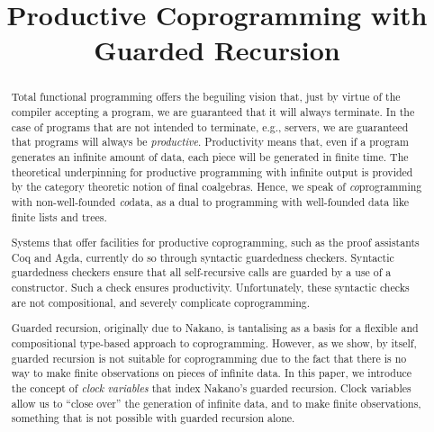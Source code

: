 \documentclass[natbib]{sigplanconf}
\title{Productive Coprogramming with Guarded Recursion}
\begin{document}
\exclusivelicense
{}

\maketitle

\begin{abstract}
  Total functional programming offers the beguiling vision that, just
  by virtue of the compiler accepting a program, we are guaranteed
  that it will always terminate. In the case of programs that are not
  intended to terminate, e.g., servers, we are guaranteed that
  programs will always be \emph{productive}. Productivity means that,
  even if a program generates an infinite amount of data, each piece
  will be generated in finite time. The theoretical underpinning for
  productive programming with infinite output is provided by the
  category theoretic notion of final coalgebras. Hence, we speak of
  \emph{co}programming with non-well-founded \emph{co}data, as a dual
  to programming with well-founded data like finite lists and trees.

  Systems that offer facilities for productive coprogramming, such as
  the proof assistants Coq and Agda, currently do so through syntactic
  guardedness checkers. Syntactic guardedness checkers ensure that all
  self-recursive calls are guarded by a use of a constructor. Such a
  check ensures productivity. Unfortunately, these syntactic checks
  are not compositional, and severely complicate coprogramming.

  Guarded recursion, originally due to Nakano, is tantalising as a
  basis for a flexible and compositional type-based approach to
  coprogramming. However, as we show, by itself, guarded recursion is
  not suitable for coprogramming due to the fact that there is no way
  to make finite observations on pieces of infinite data. In this
  paper, we introduce the concept of \emph{clock variables} that index
  Nakano's guarded recursion. Clock variables allow us to ``close
  over'' the generation of infinite data, and to make finite
  observations, something that is not possible with guarded recursion
  alone.
\end{abstract}

  
\end{document}
